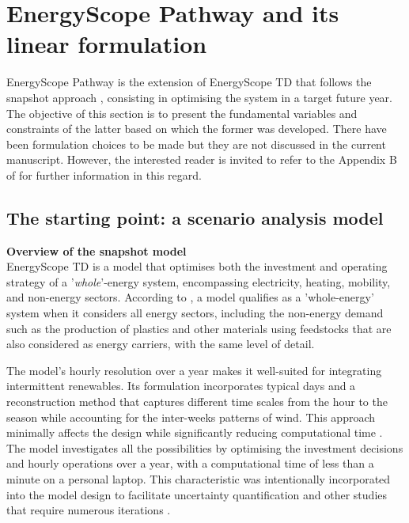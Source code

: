 \section{EnergyScope Pathway and its linear formulation} 
\label{app:ESPathway_full_formulation}

EnergyScope Pathway is the extension of EnergyScope TD \cite{limpens2019energyscope} that follows the snapshot approach \cite{Girones2015}, consisting in optimising the system in a target future year. The objective of this section is to present the fundamental variables and constraints of the latter based on which the former was developed. There have been formulation choices to be made but they are not discussed in the current manuscript. However, the interested reader is invited to refer to the Appendix B of \cite{limpens2024pathway} for further information in this regard.

\subsection{The starting point: a scenario analysis model}
\label{app:ESTD}

\vspace{0.2cm}\textbf{Overview of the snapshot model}\vspace{-0.3cm}\\

EnergyScope TD \cite{limpens2019energyscope} is a model that optimises both the investment and operating strategy of a '\emph{whole}'-energy system, encompassing electricity, heating, mobility, and non-energy sectors. According to \citet{contino2020whole}, a model qualifies as a 'whole-energy' system when it considers all energy sectors, including the non-energy demand such as the production of plastics and other materials using feedstocks that are also considered as energy carriers, with the same level of detail.

The model's hourly resolution over a year makes it well-suited for integrating intermittent renewables. Its formulation incorporates typical days and a reconstruction method that captures different time scales from the hour to the season while accounting for the inter-weeks patterns of wind. This approach minimally affects the design while significantly reducing computational time \cite{thiran2023validation}. The model investigates all the possibilities by optimising the investment decisions and hourly operations over a year, with a computational time of less than a minute on a personal laptop. This characteristic was intentionally incorporated into the model design to facilitate uncertainty quantification and other studies that require numerous iterations \cite{rixhon2021role}.


